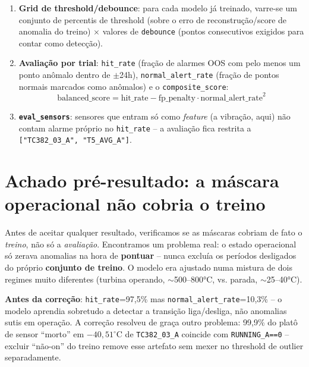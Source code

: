 \documentclass[11pt,a4paper]{article}
\begin{document}
\begin{enumerate}[leftmargin=*]
\item \textbf{Grid de threshold/debounce}: para cada modelo já treinado,
  varre-se um conjunto de percentis de threshold (sobre o erro de
  reconstrução/score de anomalia do treino) $\times$ valores de
  \texttt{debounce} (pontos consecutivos exigidos para contar como
  detecção).

\item \textbf{Avaliação por trial}: \texttt{hit\_rate} (fração de alarmes
  OOS com pelo menos um ponto anômalo dentro de $\pm$24h),
  \texttt{normal\_alert\_rate} (fração de pontos normais marcados como
  anômalos) e o \texttt{composite\_score}:
  \[
  \text{balanced\_score} = \text{hit\_rate} - \text{fp\_penalty} \cdot \text{normal\_alert\_rate}^2
  \]

\item \textbf{\texttt{eval\_sensors}}: sensores que entram só como
  \emph{feature} (a vibração, aqui) não contam alarme próprio no
  \texttt{hit\_rate} -- a avaliação fica restrita a
  \texttt{["TC382\_03\_A", "T5\_AVG\_A"]}.

\end{enumerate}

\section{Achado pré-resultado: a máscara operacional não cobria o treino}
\label{sec:bug-exp6}

Antes de aceitar qualquer resultado, verificamos se as máscaras cobriam de
fato o \emph{treino}, não só a \emph{avaliação}. Encontramos um problema
real: o estado operacional só zerava anomalias na hora de
\textbf{pontuar} -- nunca excluía os períodos desligados do próprio
\textbf{conjunto de treino}. O modelo era ajustado numa mistura de dois
regimes muito diferentes (turbina operando, $\sim$500--800°C, vs. parada,
$\sim$25--40°C).

\textbf{Antes da correção}: \texttt{hit\_rate}=97,5\% mas
\texttt{normal\_alert\_rate}=10,3\% -- o modelo aprendia sobretudo a
detectar a transição liga/desliga, não anomalias sutis em operação. A
correção resolveu de graça outro problema: 99,9\% do platô de sensor
``morto'' em $-40{,}51^{\circ}$C de \texttt{TC382\_03\_A} coincide com
\texttt{RUNNING\_A==0} -- excluir ``não-on'' do treino remove esse
artefato sem mexer no threshold de outlier separadamente.
\end{document}
